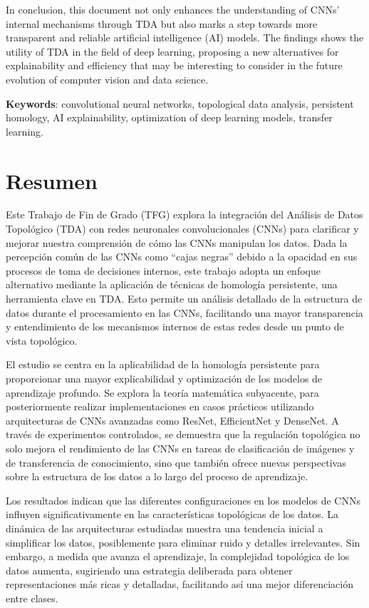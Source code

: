 In conclusion, this document not only enhances the understanding of CNNs'
internal mechanisms through TDA but also marks a step towards more transparent
and reliable artificial intelligence (AI) models. The findings shows the utility
of TDA in the field of deep learning, proposing a new alternatives for
explainability and efficiency that may be interesting to consider in the future
evolution of computer vision and data science.

\bigskip
\textbf{Keywords}: convolutional neural networks, topological data analysis,
persistent homology, AI explainability, optimization of deep learning models, transfer
learning.

\chapter{Resumen}

Este Trabajo de Fin de Grado (TFG) explora la integración del Análisis de Datos
Topológico (TDA) con redes neuronales convolucionales (CNNs) para clarificar y
mejorar nuestra comprensión de cómo las CNNs manipulan los datos. Dada la percepción
común de las CNNs como \enquote{cajas negras} debido a la opacidad en sus
procesos de toma de decisiones internos, este trabajo adopta un enfoque alternativo
mediante la aplicación de técnicas de homología persistente, una herramienta
clave en TDA. Esto permite un análisis detallado de la estructura de datos durante
el procesamiento en las CNNs, facilitando una mayor transparencia y
entendimiento de los mecanismos internos de estas redes desde un punto de vista
topológico.

El estudio se centra en la aplicabilidad de la homología persistente para
proporcionar una mayor explicabilidad y optimización de los modelos de
aprendizaje profundo. Se explora la teoría matemática subyacente, para
posteriormente realizar implementaciones en casos prácticos utilizando
arquitecturas de CNNs avanzadas como ResNet, EfficientNet y DenseNet. A través
de experimentos controlados, se demuestra que la regulación topológica no solo mejora
el rendimiento de las CNNs en tareas de clasificación de imágenes y de transferencia
de conocimiento, sino que también ofrece nuevas perspectivas sobre la estructura
de los datos a lo largo del proceso de aprendizaje.

Los resultados indican que las diferentes configuraciones en los modelos de CNNs
influyen significativamente en las características topológicas de los datos. La dinámica
de las arquitecturas estudiadas muestra una tendencia inicial a simplificar los datos,
posiblemente para eliminar ruido y detalles irrelevantes. Sin embargo, a medida
que avanza el aprendizaje, la complejidad topológica de los datos aumenta,
sugiriendo una estrategia deliberada para obtener representaciones más ricas y
detalladas, facilitando así una mejor diferenciación entre clases.

